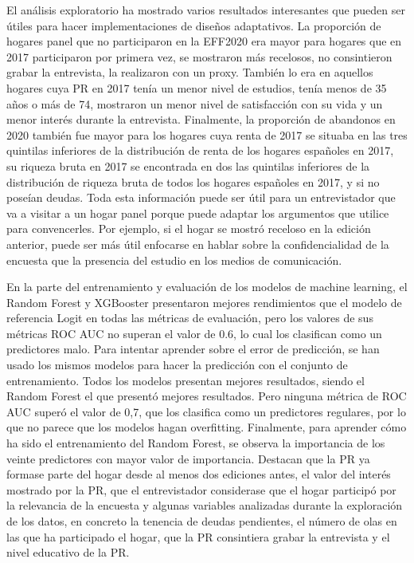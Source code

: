 El análisis exploratorio ha mostrado varios resultados interesantes que pueden ser útiles para hacer implementaciones de diseños adaptativos. La proporción de hogares panel que no participaron en la EFF2020 era mayor para hogares que en 2017 participaron por primera vez, se mostraron más recelosos, no consintieron grabar la entrevista, la realizaron con un proxy. También lo era en aquellos hogares cuya PR en 2017 tenía un menor nivel de estudios, tenía menos de 35 años o más de 74, mostraron un menor nivel de satisfacción con su vida y un menor interés durante la entrevista. Finalmente, la proporción de abandonos en 2020 también fue mayor para los hogares cuya renta de 2017 se situaba en las tres quintilas inferiores de la distribución de renta de los hogares españoles en 2017, su riqueza bruta en 2017 se encontrada en dos las quintilas inferiores de la distribución de riqueza bruta de todos los hogares españoles en 2017, y si no poseían deudas. Toda esta información puede ser útil para un entrevistador que va a visitar a un hogar panel porque puede adaptar los argumentos que utilice para convencerles. Por ejemplo, si el hogar se mostró receloso en la edición anterior, puede ser más útil enfocarse en hablar sobre la confidencialidad de la encuesta que la presencia del estudio en los medios de comunicación.

En la parte del entrenamiento y evaluación de los modelos de machine learning, el Random Forest y XGBooster presentaron mejores rendimientos que el modelo de referencia Logit en todas las métricas de evaluación, pero los valores de sus métricas ROC AUC no superan el valor de 0.6, lo cual los clasifican como un predictores malo. Para intentar aprender sobre el error de predicción, se han usado los mismos modelos para hacer la predicción con el conjunto de entrenamiento. Todos los modelos presentan mejores resultados, siendo el Random Forest el que presentó mejores resultados. Pero ninguna métrica de ROC AUC superó el valor de 0,7, que los clasifica como un predictores regulares, por lo que no parece que los modelos hagan overfitting. Finalmente, para aprender cómo ha sido el entrenamiento del Random Forest, se observa la importancia de los veinte predictores con mayor valor de importancia. Destacan que la PR ya formase parte del hogar desde al menos dos ediciones antes, el valor del interés mostrado por la PR, que el entrevistador considerase que el hogar participó por la relevancia de la encuesta y algunas variables analizadas durante la exploración de los datos, en concreto la tenencia de deudas pendientes, el número de olas en las que ha participado el hogar, que la PR consintiera grabar la entrevista y el nivel educativo de la PR.

